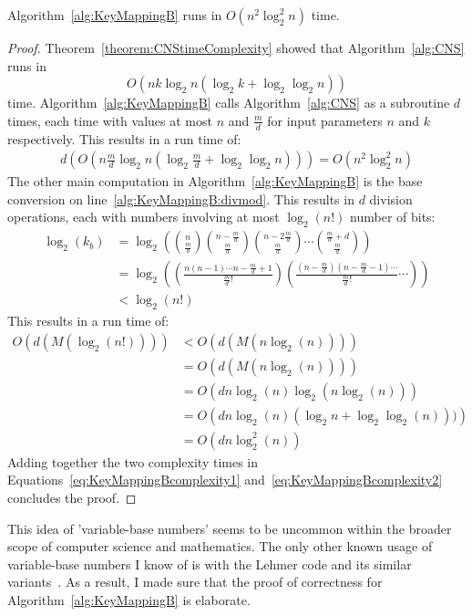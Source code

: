 \begin{theorem}
Algorithm~\ref{alg:KeyMappingB} runs in $O\left(n^2\log_2^2 n \right)$ time.
\end{theorem}
\begin{proof}
Theorem~\ref{theorem:CNStimeComplexity} showed that Algorithm~\ref{alg:CNS} runs in $$O\left(nk\log_2 n(\log_2 k+\log_2\log_2 n)\right)$$ time. Algorithm~\ref{alg:KeyMappingB} calls Algorithm~\ref{alg:CNS} as a subroutine $d$ times, each time with values at most $n$ and $\frac{m}{d}$ for input parameters $n$ and $k$ respectively. This results in a run time of:
\begin{align}
d(O\left(n\frac{m}{d}\log_2 n (\log_2 \frac{m}{d} + \log_2 \log_2 n)\right)) = O\left(n^2\log_2^2 n\right) \label{eq:KeyMappingBcomplexity1}
\end{align}
The other main computation in Algorithm~\ref{alg:KeyMappingB} is the base conversion on line~\ref{alg:KeyMappingB:divmod}. This results in $d$ division operations, each with numbers involving at most $\log_2(n!)$ number of bits:
\begin{align}
\log_2(k_b) &= \log_2\left({n \choose \frac{m}{d}}{n - \frac{m}{d} \choose \frac{m}{d}}{n - 2\frac{m}{d} \choose \frac{m}{d}}\cdots{\frac{m}{d} + d \choose \frac{m}{d}}\right) \\
&= \log_2\left(\left(\frac{n(n-1)\cdots n-\frac{m}{d}+1}{\frac{m}{d}!}\right)\left(\frac{(n-\frac{m}{d})(n-\frac{m}{d}-1)\cdots }{\frac{m}{d}!}\cdots\right)\right)\\
&< \log_2(n!)
\end{align}
This results in a run time of:
\begin{align}
O\left(d(M(\log_2(n!)))\right) &< O\left(d(M(n \log_2(n)))\right)\\
&= O\left(d(M(n \log_2(n)))\right) \\
&= O\left(dn \log_2(n)\log_2(n \log_2(n))\right) \\
&= O\left(dn \log_2(n)(\log_2 n + \log_2\log_2(n)))\right) \\
&= O\left(dn \log_2^2(n)\right) \label{eq:KeyMappingBcomplexity2}
\end{align}
Adding together the two complexity times in Equations~\eqref{eq:KeyMappingBcomplexity1} and~\eqref{eq:KeyMappingBcomplexity2} concludes the proof.
\end{proof}

This idea of 'variable-base numbers' seems to be uncommon within the broader scope of computer science and mathematics. The only other known usage of variable-base numbers I know of is with the Lehmer code and its similar variants~\cite{arndt2010matters}. As a result, I made sure that the proof of correctness for Algorithm~\ref{alg:KeyMappingB} is elaborate.

